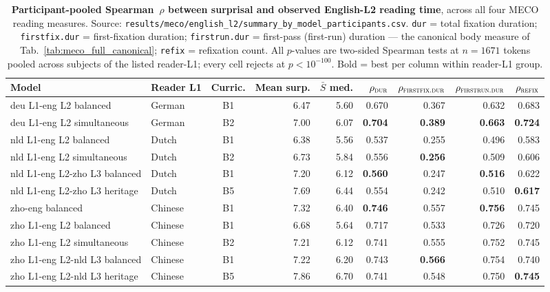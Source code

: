 \begin{table}[!ht]
  \centering
  \small
  \setlength{\tabcolsep}{4.5pt}
  \caption{\textbf{Participant-pooled Spearman~$\rho$ between \beetle{} surprisal and observed English-L2 reading time}, across all four MECO reading measures. Source: \texttt{results/meco/english\_l2/summary\_by\_model\_participants.csv}. \texttt{dur} = total fixation duration; \texttt{firstfix.dur} = first-fixation duration; \texttt{firstrun.dur} = first-pass (first-run) duration --- the canonical body measure of Tab.~\ref{tab:meco_full_canonical}; \texttt{refix} = refixation count. All $p$-values are two-sided Spearman tests at $n=1671$ tokens pooled across subjects of the listed reader-L1; every cell rejects at $p < 10^{-100}$. Bold = best per column within reader-L1 group.}
  \label{tab:meco_english_l2_participants}
  \begin{tabular}{llcrrrrrr}
    \toprule
    Model & Reader L1 & Curric. & Mean surp. & $\bar S$ med. & $\rho_\textsc{dur}$ & $\rho_\textsc{firstfix.dur}$ & $\rho_\textsc{firstrun.dur}$ & $\rho_\textsc{refix}$ \\
    \midrule
    deu L1-eng L2 balanced               & German  & B1 & 6.47 & 5.60 & 0.670 & 0.367 & 0.632 & 0.683 \\
    deu L1-eng L2 simultaneous           & German  & B2 & 7.00 & 6.07 & \textbf{0.704} & \textbf{0.389} & \textbf{0.663} & \textbf{0.724} \\
    \midrule
    nld L1-eng L2 balanced               & Dutch   & B1 & 6.38 & 5.56 & 0.537 & 0.255 & 0.496 & 0.583 \\
    nld L1-eng L2 simultaneous           & Dutch   & B2 & 6.73 & 5.84 & 0.556 & \textbf{0.256} & 0.509 & 0.606 \\
    nld L1-eng L2-zho L3 balanced        & Dutch   & B1 & 7.20 & 6.12 & \textbf{0.560} & 0.247 & \textbf{0.516} & 0.622 \\
    nld L1-eng L2-zho L3 heritage        & Dutch   & B5 & 7.69 & 6.44 & 0.554 & 0.242 & 0.510 & \textbf{0.617} \\
    \midrule
    zho-eng balanced                     & Chinese & B1 & 7.32 & 6.40 & \textbf{0.746} & 0.557 & \textbf{0.756} & 0.745 \\
    zho L1-eng L2 balanced               & Chinese & B1 & 6.68 & 5.64 & 0.717 & 0.533 & 0.726 & 0.720 \\
    zho L1-eng L2 simultaneous           & Chinese & B2 & 7.21 & 6.12 & 0.741 & 0.555 & 0.752 & 0.745 \\
    zho L1-eng L2-nld L3 balanced        & Chinese & B1 & 7.22 & 6.20 & 0.743 & \textbf{0.566} & 0.754 & 0.740 \\
    zho L1-eng L2-nld L3 heritage        & Chinese & B5 & 7.86 & 6.70 & 0.741 & 0.548 & 0.750 & \textbf{0.745} \\
    \bottomrule
  \end{tabular}
\end{table}

